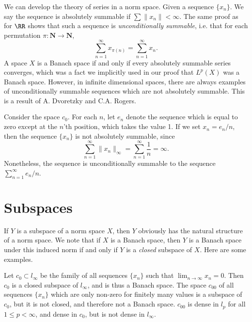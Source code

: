 We can develop the theory of series in a norm space. Given a sequence $\{ x_n \}$. We say the sequence is absolutely summable if $\sum \| x_n \| < \infty$. The same proof as for $\RR$ shows that such a sequence is {\it unconditionally summable}, i.e. that for each permutation $\pi: \mathbf{N} \to \mathbf{N}$,
%
\[ \sum_{n = 1}^\infty x_{\pi(n)} = \sum_{n = 1}^\infty x_n. \]
%
A space $X$ is a Banach space if and only if every absolutely summable series converges, which was a fact we implicitly used in our proof that $L^p(X)$ was a Banach space. However, in infinite dimensional spaces, there are always examples of unconditionally summable sequences which are not absolutely summable. This is a result of A. Dvoretzky and C.A. Rogers.

\begin{example}
    Consider the space $c_0$. For each $n$, let $e_n$ denote the sequence which is equal to zero except at the $n$'th position, which takes the value 1. If we set $x_n = e_n / n$, then the sequence $\{ x_n \}$ is not absolutely summable, since
    \[ \sum_{n = 1}^\infty \| x_n \|_\infty = \sum_{n = 1}^\infty \frac{1}{n} = \infty. \]
    Nonetheless, the sequence is unconditionally summable to the sequence $\sum_{n = 1}^\infty e_n/n$.
\end{example}

\section{Subspaces}

If $Y$ is a subspace of a norm space $X$, then $Y$ obviously has the natural structure of a norm space. We note that if $X$ is a Banach space, then $Y$ is a Banach space under this induced norm if and only if $Y$ is a {\it closed} subspace of $X$. Here are some examples.

\begin{example}
    Let $c_0 \subset l_\infty$ be the family of all sequences $\{ x_n \}$ such that $\lim_{n \to \infty} x_n = 0$. Then $c_0$ is a closed subspace of $l_\infty$, and is thus a Banach space. The space $c_{00}$ of all sequences $\{ x_n \}$ which are only non-zero for finitely many values is a subspace of $c_0$, but it is not closed, and therefore not a Banach space. $c_{00}$ is dense in $l_p$ for all $1 \leq p < \infty$, and dense in $c_0$, but is not dense in $l_\infty$.
\end{example}

